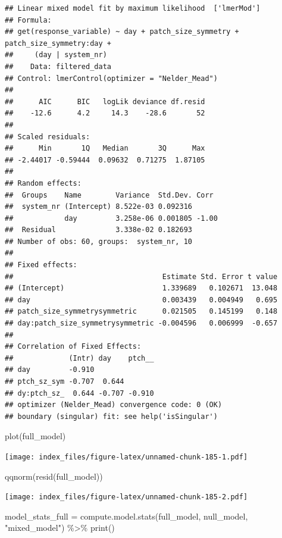 \documentclass[
]{article}
\newenvironment{Shaded}{\begin{snugshade}}{\end{snugshade}}
\newcommand{\FunctionTok}[1]{\textcolor[rgb]{0.00,0.00,0.00}{#1}}
\newcommand{\NormalTok}[1]{#1}
\newcommand{\OtherTok}[1]{\textcolor[rgb]{0.56,0.35,0.01}{#1}}
\newcommand{\SpecialCharTok}[1]{\textcolor[rgb]{0.00,0.00,0.00}{#1}}
\newcommand{\StringTok}[1]{\textcolor[rgb]{0.31,0.60,0.02}{#1}}
\begin{document}
\begin{verbatim}
## Linear mixed model fit by maximum likelihood  ['lmerMod']
## Formula: 
## get(response_variable) ~ day + patch_size_symmetry + patch_size_symmetry:day +  
##     (day | system_nr)
##    Data: filtered_data
## Control: lmerControl(optimizer = "Nelder_Mead")
## 
##      AIC      BIC   logLik deviance df.resid 
##    -12.6      4.2     14.3    -28.6       52 
## 
## Scaled residuals: 
##      Min       1Q   Median       3Q      Max 
## -2.44017 -0.59444  0.09632  0.71275  1.87105 
## 
## Random effects:
##  Groups    Name        Variance  Std.Dev. Corr 
##  system_nr (Intercept) 8.522e-03 0.092316      
##            day         3.258e-06 0.001805 -1.00
##  Residual              3.338e-02 0.182693      
## Number of obs: 60, groups:  system_nr, 10
## 
## Fixed effects:
##                                   Estimate Std. Error t value
## (Intercept)                       1.339689   0.102671  13.048
## day                               0.003439   0.004949   0.695
## patch_size_symmetrysymmetric      0.021505   0.145199   0.148
## day:patch_size_symmetrysymmetric -0.004596   0.006999  -0.657
## 
## Correlation of Fixed Effects:
##             (Intr) day    ptch__
## day         -0.910              
## ptch_sz_sym -0.707  0.644       
## dy:ptch_sz_  0.644 -0.707 -0.910
## optimizer (Nelder_Mead) convergence code: 0 (OK)
## boundary (singular) fit: see help('isSingular')
\end{verbatim}

\begin{Shaded}
\begin{Highlighting}[]
\FunctionTok{plot}\NormalTok{(full\_model)}
\end{Highlighting}
\end{Shaded}

\texttt{[image: index\_files/figure-latex/unnamed-chunk-185-1.pdf]}

\begin{Shaded}
\begin{Highlighting}[]
\FunctionTok{qqnorm}\NormalTok{(}\FunctionTok{resid}\NormalTok{(full\_model))}
\end{Highlighting}
\end{Shaded}

\texttt{[image: index\_files/figure-latex/unnamed-chunk-185-2.pdf]}

\begin{Shaded}
\begin{Highlighting}[]
\NormalTok{model\_stats\_full }\OtherTok{=} \FunctionTok{compute.model.stats}\NormalTok{(full\_model,}
\NormalTok{                                       null\_model,}
                                       \StringTok{"mixed\_model"}\NormalTok{) }\SpecialCharTok{\%\textgreater{}\%}
  \FunctionTok{print}\NormalTok{()}
\end{Highlighting}
\end{Shaded}
\end{document}

